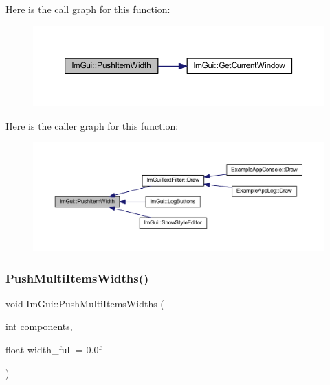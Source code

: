Here is the call graph for this function\+:
\nopagebreak
\begin{figure}[H]
\begin{center}
\leavevmode
\includegraphics[width=350pt]{namespace_im_gui_a4ad13bf38f0521a339133248ef3e3036_cgraph}
\end{center}
\end{figure}
Here is the caller graph for this function\+:
\nopagebreak
\begin{figure}[H]
\begin{center}
\leavevmode
\includegraphics[width=350pt]{namespace_im_gui_a4ad13bf38f0521a339133248ef3e3036_icgraph}
\end{center}
\end{figure}
\mbox{\label{namespace_im_gui_ab913605fcf6d405d102cdf56cd414a5a}} 
\subsubsection{\texorpdfstring{Push\+Multi\+Items\+Widths()}{PushMultiItemsWidths()}}
{\footnotesize\ttfamily void Im\+Gui\+::\+Push\+Multi\+Items\+Widths (\begin{DoxyParamCaption}\item[{int}]{components,  }\item[{float}]{width\+\_\+full = {\ttfamily 0.0f} }\end{DoxyParamCaption})}

